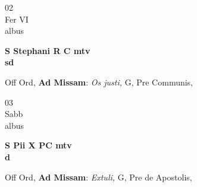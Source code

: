 \documentclass[10pt, openany]{book}
\begin{document}
        \begin{center}
            \begin{minipage}{3.5in}
                \vspace{2em}
                \begin{minipage}{0.5in}
                    {\Huge 02} \\
                    {\normalsize Fer VI} \\
                    {\normalsize albus}
                \end{minipage}
                \begin{minipage}{3.0in}
                    \textbf{ \large S Stephani R C mtv \\
                    \textnormal{\normalsize sd}} \\ 
                \end{minipage}
                \begin{justify}Off Ord, \textbf{Ad Missam}: \textit{Os justi,} G, Pre Communis,  
                \end{justify}
            \end{minipage}
        \end{center}
    
        \begin{center}
            \begin{minipage}{3.5in}
                \vspace{2em}
                \begin{minipage}{0.5in}
                    {\Huge 03} \\
                    {\normalsize Sabb} \\
                    {\normalsize albus}
                \end{minipage}
                \begin{minipage}{3.0in}
                    \textbf{ \large S Pii X PC mtv \\
                    \textnormal{\normalsize d}} \\ 
                \end{minipage}
                \begin{justify}Off Ord, \textbf{Ad Missam}: \textit{Extuli,} G, Pre de Apostolis,  
                \end{justify}
            \end{minipage}
        \end{center}
    
\end{document}
